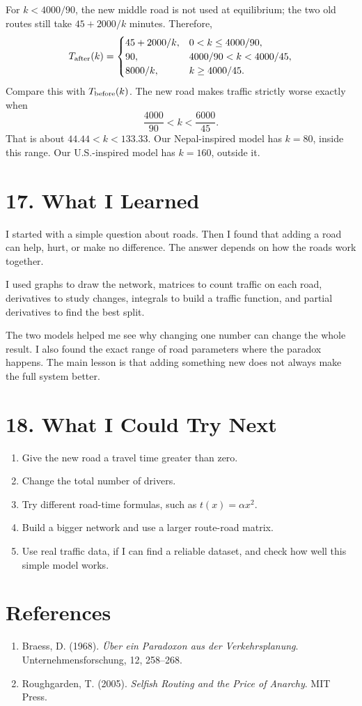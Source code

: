 \documentclass[11pt,a4paper]{article}
\newcommand{\sectiontitle}[1]{\section*{\color{navy}#1}}
\begin{document}
For $k<4000/90$, the new middle road is not used at equilibrium; the two old routes still take $45+2000/k$ minutes. Therefore,
\[
T_{\rm after}(k)=
\begin{cases}
45+2000/k, & 0<k\leq 4000/90,\\
90, & 4000/90<k<4000/45,\\
8000/k, & k\geq4000/45.
\end{cases}
\]
Compare this with $T_{\rm before}(k)$. The new road makes traffic strictly worse exactly when
\[\boxed{\frac{4000}{90}<k<\frac{6000}{45}.}\]
That is about $44.44<k<133.33$. Our Nepal-inspired model has $k=80$, inside this range. Our U.S.-inspired model has $k=160$, outside it.

\begin{center}\end{center}

\sectiontitle{17. What I Learned}
I started with a simple question about roads. Then I found that adding a road can help, hurt, or make no difference. The answer depends on how the roads work together.

I used graphs to draw the network, matrices to count traffic on each road, derivatives to study changes, integrals to build a traffic function, and partial derivatives to find the best split.

The two models helped me see why changing one number can change the whole result. I also found the exact range of road parameters where the paradox happens. The main lesson is that adding something new does not always make the full system better.

\sectiontitle{18. What I Could Try Next}
\begin{enumerate}[leftmargin=*]
\item Give the new road a travel time greater than zero.
\item Change the total number of drivers.
\item Try different road-time formulas, such as $t(x)=\alpha x^2$.
\item Build a bigger network and use a larger route-road matrix.
\item Use real traffic data, if I can find a reliable dataset, and check how well this simple model works.
\end{enumerate}

\sectiontitle{References}
\begin{enumerate}[leftmargin=*]
\item Braess, D. (1968). \textit{\"Uber ein Paradoxon aus der Verkehrsplanung}. Unternehmensforschung, 12, 258--268.
\item Roughgarden, T. (2005). \textit{Selfish Routing and the Price of Anarchy}. MIT Press.
\end{enumerate}
\end{document}
